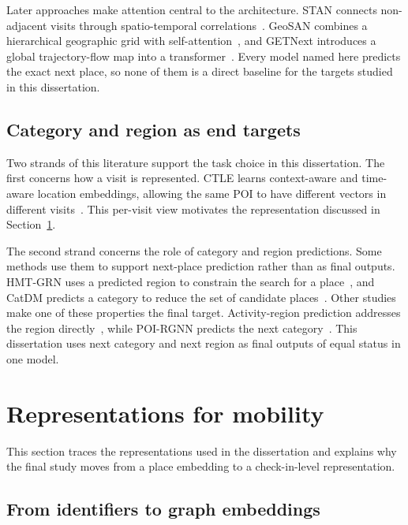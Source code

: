 Later approaches make attention central to the architecture. STAN connects
non-adjacent visits through spatio-temporal correlations~\cite{luo2021stan}. GeoSAN
combines a hierarchical geographic grid with self-attention~\cite{lian2020geosan}, and
GETNext introduces a global trajectory-flow map into a
transformer~\cite{yang2022getnext}. Every model named here predicts the exact next
place, so none of them is a direct baseline for the targets studied in this dissertation.

\subsection{Category and region as end targets}

Two strands of this literature support the task choice in this dissertation. The first
concerns how a visit is represented. CTLE learns context-aware and time-aware location
embeddings, allowing the same POI to have different vectors in different
visits~\cite{lin2021ctle}. This per-visit view motivates the representation discussed in
Section~\ref{sec:fund:repr}.

The second strand concerns the role of category and region predictions. Some methods
use them to support next-place prediction rather than as final outputs. HMT-GRN uses a
predicted region to constrain the search for a place~\cite{Lim2022}, and CatDM predicts
a category to reduce the set of candidate places~\cite{yu2020catdm}. Other studies make
one of these properties the final target. Activity-region prediction addresses the
region directly~\cite{zhu2022drrgnn}, while POI-RGNN predicts the next
category~\cite{capanema2023poirgnn}. This dissertation uses next category and next
region as final outputs of equal status in one model.


\section{Representations for mobility}
\label{sec:fund:repr}

This section traces the representations used in the dissertation and explains why the
final study moves from a place embedding to a check-in-level representation.

\subsection{From identifiers to graph embeddings}

